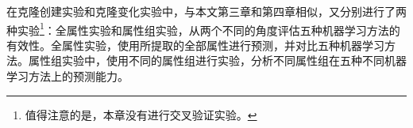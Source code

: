 在克隆创建实验和克隆变化实验中，与本文第三章和第四章相似，又分别进行了两种实验\footnote{值得注意的是，本章没有进行交叉验证实验。}：全属性实验和属性组实验，从两个不同的角度评估五种机器学习方法的有效性。全属性实验，使用所提取的全部属性进行预测，并对比五种机器学习方法。属性组实验中，使用不同的属性组进行实验，分析不同属性组在五种不同机器学习方法上的预测能力。





